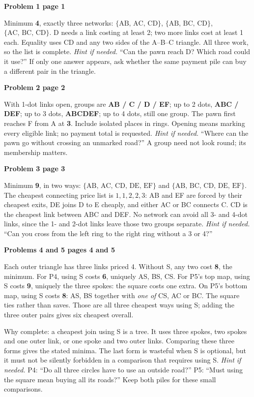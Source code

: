 \documentclass[11pt]{article}
\newcommand{\sub}[1]{\par\textbf{#1}\par}
\newcommand{\hint}[1]{\textit{Hint if needed.} #1}
\newcommand{\links}[1]{\ensuremath{\{\text{#1}\}}}
\begin{document}
\sub{Problem 1 page 1}
Minimum \textbf{4}, exactly three networks: \links{AB, AC, CD}, \links{AB, BC, CD}, \links{AC, BC, CD}. D needs a link costing at least 2; two more links cost at least 1 each. Equality uses CD and any two sides of the A--B--C triangle. All three work, so the list is complete. \hint{``Can the pawn reach D? Which road could it use?''} If only one answer appears, ask whether the same payment pile can buy a different pair in the triangle.

\sub{Problem 2 page 2}
With 1-dot links open, groups are \textbf{AB / C / D / EF}; up to 2 dots, \textbf{ABC / DEF}; up to 3 dots, \textbf{ABCDEF}; up to 4 dots, still one group. The pawn first reaches F from A at \textbf{3}. Include isolated places in rings. Opening means marking every eligible link; no payment total is requested. \hint{``Where can the pawn go without crossing an unmarked road?''} A group need not look round; its membership matters.

\sub{Problem 3 page 3}
Minimum \textbf{9}, in two ways: \links{AB, AC, CD, DE, EF} and \links{AB, BC, CD, DE, EF}. The cheapest connecting price list is $1,1,2,2,3$: AB and EF are forced by their cheapest exits, DE joins D to E cheaply, and either AC or BC connects C. CD is the cheapest link between ABC and DEF. No network can avoid all 3- and 4-dot links, since the 1- and 2-dot links leave those two groups separate. \hint{``Can you cross from the left ring to the right ring without a 3 or 4?''}

\sub{Problems 4 and 5 pages 4 and 5}
Each outer triangle has three links priced 4. Without S, any two cost \textbf{8}, the minimum. For P4, using S costs \textbf{6}, uniquely AS, BS, CS. For P5's top map, using S costs \textbf{9}, uniquely the three spokes: the square costs one extra. On P5's bottom map, using S costs \textbf{8}: AS, BS together with \emph{one of} CS, AC or BC. The square ties rather than saves. Those are all three cheapest ways using S; adding the three outer pairs gives six cheapest overall.

Why complete: a cheapest join using S is a tree. It uses three spokes, two spokes and one outer link, or one spoke and two outer links. Comparing these three forms gives the stated minima. The last form is wasteful when S is optional, but it must not be silently forbidden in a comparison that requires using S. \hint{P4: ``Do all three circles have to use an outside road?'' P5: ``Must using the square mean buying all its roads?''} Keep both piles for these small comparisons.
\end{document}
